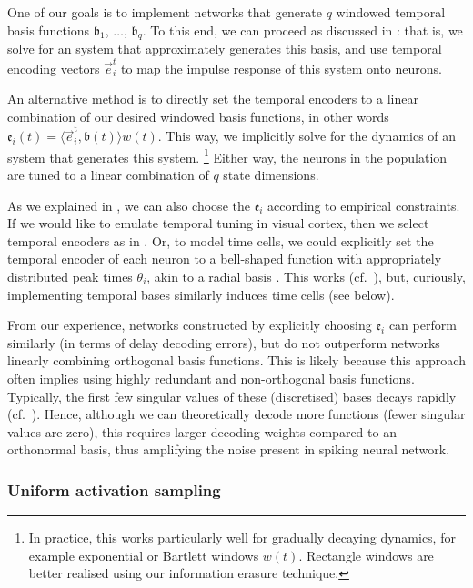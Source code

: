 One of our goals is to implement networks that generate $q$ windowed temporal basis functions $\mathfrak{b}_1$, $\ldots$, $\mathfrak{b}_q$.
To this end, we can proceed as discussed in : that is, we solve for an \LTI system that approximately generates this basis, and use temporal encoding vectors $\vec{e}^t_i$ to map the impulse response of this system onto neurons.

An alternative method is to directly set the temporal encoders to a linear combination of our desired windowed basis functions, in other words $\mathfrak{e}_i(t) = \langle \vec{e}^\mathrm{t}_i, \mathfrak{b}(t) \rangle  w(t)$.
This way, we implicitly solve for the dynamics of an \LTI system that generates this system.%
\footnote{In practice, this works particularly well for gradually decaying dynamics, for example exponential or Bartlett windows $w(t)$. Rectangle windows are better realised using our information erasure technique.}
Either way, the neurons in the population are tuned to a linear combination of $q$ state dimensions.

As we explained in , we can also choose the $\mathfrak{e}_i$ according to empirical constraints.
If we would like to emulate temporal tuning in visual cortex, then we select temporal encoders as in .
Or, to model time cells, we could explicitly set the temporal encoder of each neuron to a bell-shaped function with appropriately distributed peak times $\theta_i$, akin to a radial basis \citep{broomhead1988radial,stockel2020assorted}.
This works (cf.~), but, curiously, implementing temporal bases similarly induces time cells (see below).

From our experience, networks constructed by explicitly choosing $\mathfrak{e}_i$ can perform similarly (in terms of delay decoding errors), but do not outperform networks linearly combining orthogonal basis functions.
This is likely because this approach often implies using highly redundant and non-orthogonal basis functions.
Typically, the first few singular values of these (discretised) bases decays rapidly (cf.~).
Hence, although we can theoretically decode more functions (fewer singular values are zero), this requires larger decoding weights compared to an orthonormal basis, thus amplifying the noise present in spiking neural network.


\subsubsection{Uniform activation sampling}

